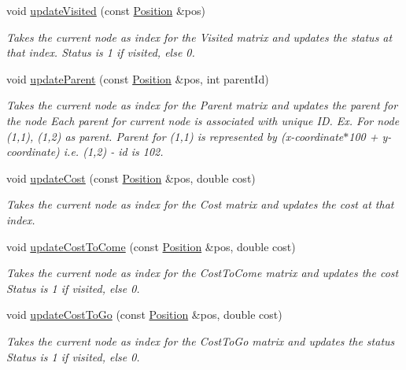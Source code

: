 \begin{DoxyCompactItemize}
\item 
void \hyperlink{classNodesManager_af14624200c5dba19deb48628fdb38338}{update\+Visited} (const \hyperlink{structPosition}{Position} \&pos)
\begin{DoxyCompactList}\small\item\em Takes the current node as index for the Visited matrix and updates the status at that index. Status is 1 if visited, else 0. \end{DoxyCompactList}\item 
void \hyperlink{classNodesManager_a7e33a29ae5bb0fdbf061cf71cad10161}{update\+Parent} (const \hyperlink{structPosition}{Position} \&pos, int parent\+Id)
\begin{DoxyCompactList}\small\item\em Takes the current node as index for the Parent matrix and updates the parent for the node Each parent for current node is associated with unique ID. Ex. For node (1,1), (1,2) as parent. Parent for (1,1) is represented by (x-\/coordinate$\ast$100 + y-\/coordinate) i.\+e. (1,2) -\/ id is 102. \end{DoxyCompactList}\item 
void \hyperlink{classNodesManager_a97a3abf51b1a265aff8b2b0428e021bd}{update\+Cost} (const \hyperlink{structPosition}{Position} \&pos, double cost)
\begin{DoxyCompactList}\small\item\em Takes the current node as index for the Cost matrix and updates the cost at that index. \end{DoxyCompactList}\item 
void \hyperlink{classNodesManager_afe93611a7771f10bc2d6a33a01cdb80c}{update\+Cost\+To\+Come} (const \hyperlink{structPosition}{Position} \&pos, double cost)
\begin{DoxyCompactList}\small\item\em Takes the current node as index for the Cost\+To\+Come matrix and updates the cost Status is 1 if visited, else 0. \end{DoxyCompactList}\item 
void \hyperlink{classNodesManager_acb8c01841ac88537ccfaf5cafec0be26}{update\+Cost\+To\+Go} (const \hyperlink{structPosition}{Position} \&pos, double cost)
\begin{DoxyCompactList}\small\item\em Takes the current node as index for the Cost\+To\+Go matrix and updates the status Status is 1 if visited, else 0. \end{DoxyCompactList}\item 

\end{DoxyCompactItemize}
